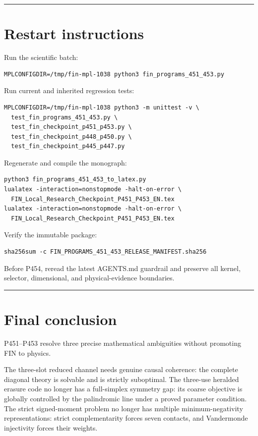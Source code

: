 \documentclass[11pt,a4paper,openany]{report}
\begin{document}
\par\medskip\hrule\medskip

\chapter{Restart instructions}

Run the scientific batch:

\begin{Verbatim}[fontsize=\small]
MPLCONFIGDIR=/tmp/fin-mpl-1038 python3 fin_programs_451_453.py
\end{Verbatim}

Run current and inherited regression tests:

\begin{Verbatim}[fontsize=\small]
MPLCONFIGDIR=/tmp/fin-mpl-1038 python3 -m unittest -v \
  test_fin_programs_451_453.py \
  test_fin_checkpoint_p451_p453.py \
  test_fin_checkpoint_p448_p450.py \
  test_fin_checkpoint_p445_p447.py
\end{Verbatim}

Regenerate and compile the monograph:

\begin{Verbatim}[fontsize=\small]
python3 fin_programs_451_453_to_latex.py
lualatex -interaction=nonstopmode -halt-on-error \
  FIN_Local_Research_Checkpoint_P451_P453_EN.tex
lualatex -interaction=nonstopmode -halt-on-error \
  FIN_Local_Research_Checkpoint_P451_P453_EN.tex
\end{Verbatim}

Verify the immutable package:

\begin{Verbatim}[fontsize=\small]
sha256sum -c FIN_PROGRAMS_451_453_RELEASE_MANIFEST.sha256
\end{Verbatim}

Before P454, reread the latest AGENTS.md guardrail and preserve all kernel, selector, dimensional, and physical-evidence boundaries.

\par\medskip\hrule\medskip

\chapter{Final conclusion}

P451--P453 resolve three precise mathematical ambiguities without promoting FIN to physics.

The three-slot reduced channel needs genuine causal coherence: the complete diagonal theory is solvable and is strictly suboptimal. The three-use heralded erasure code no longer has a full-simplex symmetry gap: its coarse objective is globally controlled by the palindromic line under a proved parameter condition. The strict signed-moment problem no longer has multiple minimum-negativity representations: strict complementarity forces seven contacts, and Vandermonde injectivity forces their weights.
\end{document}

